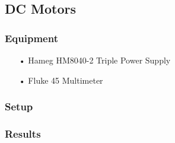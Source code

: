 \subsection{DC Motors}
\subsubsection{Equipment}
\begin{enumerate}
	\item[•]Hameg HM8040-2 Triple Power Supply
	\item[•]Fluke 45 Multimeter
\end{enumerate}

\subsubsection{Setup}

\subsubsection{Results}